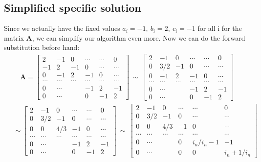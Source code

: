 \documentclass[american,a4paper,12pt]{article}
\renewcommand{\vec}[1]{\mathbf{#1}} %
\begin{document}
\subsection{Simplified specific solution}
Since we actually have the fixed values $a_i = -1,\ b_i = 2,\ c_i = -1$ for all i for the matrix $\vec{A}$, we can simplify our algorithm even more. Now we can do the forward substitution before hand:
\begin{align*}
    \vec{A} =
    \begin{bmatrix}
    2 & -1 & 0 & \cdots & \cdots & 0 \\
    -1 & 2 & -1 & 0 & \cdots & \cdots \\
    0 & -1 & 2 & -1 & 0 & \cdots \\
    \cdots & \cdots & \cdots & \cdots & \cdots & \cdots \\
    0 & \cdots & & -1 & 2 & -1 \\
    0 & \cdots & & 0 & -1 & 2
    \end{bmatrix}
    \ \sim \
    \begin{bmatrix}
    2 & -1 & 0 & \cdots & \cdots & 0 \\
    0 & 3/2 & -1 & 0 & \cdots & \cdots \\
    0 & -1 & 2 & -1 & 0 & \cdots \\
    \cdots & \cdots & \cdots & \cdots & \cdots & \cdots \\
    0 & \cdots & & -1 & 2 & -1 \\
    0 & \cdots & & 0 & -1 & 2
    \end{bmatrix}
\end{align*}
\begin{align*}
    \quad \sim
    \begin{bmatrix}
    2 & -1 & 0 & \cdots & \cdots & 0 \\
    0 & 3/2 & -1 & 0 & \cdots & \cdots \\
    0 & 0 & 4/3 & -1 & 0 & \cdots \\
    \cdots & \cdots & \cdots & \cdots & \cdots & \cdots \\
    0 & \cdots & & -1 & 2 & -1 \\
    0 & \cdots & & 0 & -1 & 2
    \end{bmatrix}
    \ \sim \
    \begin{bmatrix}
    2 & -1 & 0 & \cdots & \cdots & 0 \\
    0 & 3/2 & -1 & 0 & \cdots & \cdots \\
    0 & 0 & 4/3 & -1 & 0 & \cdots \\
    \cdots & \cdots & \cdots & \cdots & \cdots & \cdots \\
    0 & \cdots & & 0 & i_n/{i_n-1} & -1 \\
    0 & \cdots & & 0 & 0 & {i_n+1}/i_n
    \end{bmatrix} \\
\end{align*}
\end{document}

